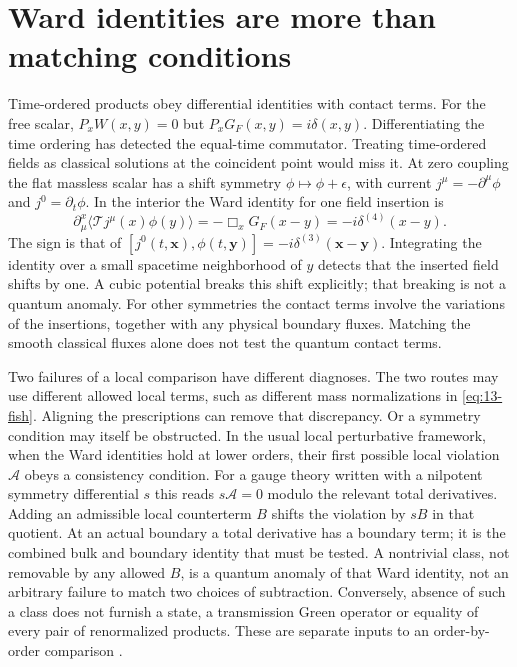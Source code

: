 \section{Ward identities are more than matching conditions}
Time-ordered products obey differential identities with contact terms.
For the free scalar, $P_xW(x,y)=0$ but $P_xG_F(x,y)=i\delta(x,y)$.
Differentiating the time ordering has detected the equal-time commutator.
Treating time-ordered fields as classical solutions at the coincident
point would miss it. At zero coupling the flat massless scalar has a shift
symmetry $\phi\mapsto\phi+\epsilon$, with current
$j^\mu=-\partial^\mu\phi$ and $j^0=\partial_t\phi$. In the interior the
Ward identity for one field insertion is
\[
 \partial_\mu^x\langle\mathcal T j^\mu(x)\phi(y)\rangle
 =-\Box_x G_F(x-y)=-i\delta^{(4)}(x-y).
\]
The sign is that of $[j^0(t,\mathbf x),\phi(t,\mathbf y)]
=-i\delta^{(3)}(\mathbf x-\mathbf y)$. Integrating the identity over a
small spacetime neighborhood of $y$ detects that the inserted field shifts
by one. A cubic potential breaks this shift explicitly; that breaking is
not a quantum anomaly. For other symmetries the contact terms involve the
variations of the insertions, together with any physical boundary fluxes.
Matching the smooth classical fluxes alone does not test the quantum
contact terms.

Two failures of a local comparison have different diagnoses. The two routes may use different allowed local terms, such as
different mass normalizations in \eqref{eq:13-fish}. Aligning the
prescriptions can remove that discrepancy. Or a symmetry condition may
itself be obstructed. In the usual local perturbative framework, when the
Ward identities hold at lower orders, their first possible local violation
$\mathcal A$ obeys a consistency condition. For a gauge theory written
with a nilpotent symmetry differential $s$ this reads $s\mathcal A=0$
modulo the relevant total derivatives. Adding an admissible local
counterterm $B$ shifts the violation by $sB$ in that quotient. At an actual
boundary a total derivative has a boundary term; it is the combined bulk
and boundary identity that must be tested. A nontrivial class, not
removable by any allowed $B$, is a quantum anomaly of that Ward identity,
not an arbitrary failure to match two choices of subtraction. Conversely,
absence of such a class does not furnish a state, a transmission Green
operator or equality of every pair of renormalized products. These are
separate inputs to an order-by-order comparison \cite{FR}.

